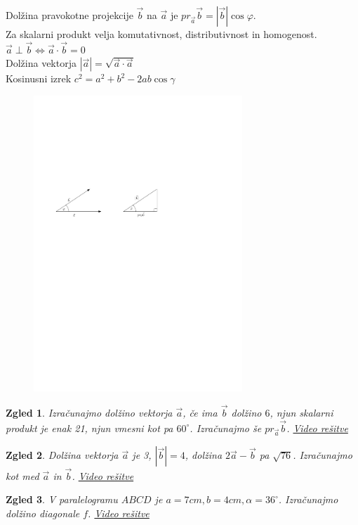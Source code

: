 \documentclass{article}
\newtheorem*{zgled}{Zgled}
\begin{document}
Dolžina pravokotne projekcije $\vec{b}$ na $\vec{a}$ je $pr_{\vec{a}}\vec{b}=|\vec{b}|\cos\varphi$.\\

Za skalarni produkt velja komutativnost, distributivnost in homogenost.\\

$\vec{a} \perp\vec{b} \iff \vec{a}\cdot\vec{b}=0$\\

Dolžina vektorja $|\vec{a}|=\sqrt{\vec{a}\cdot\vec{a}}$\\

Kosinusni izrek $c^2=a^2+b^2-2ab\cos\gamma$

\begin{figure}[H]
\includegraphics[width=0.7\textwidth]{skalarni.produkt.pdf}
\centering
\end{figure}

\begin{zgled}
    Izračunajmo dolžino vektorja $\vec{a}$, če ima $\vec{b}$ dolžino $6$, njun skalarni produkt je enak 21, njun vmesni kot pa $60^\circ$. Izračunajmo še $pr_{\vec{a}}\vec{b}$.
    \href{https://youtu.be/PCUppodHkyY}{Video rešitve}
\end{zgled}
\begin{zgled}
    Dolžina vektorja $\vec{a}$ je 3, $|\vec{b}|=4$, dolžina $2\vec{a}-\vec{b}$ pa $\sqrt{76}$. Izračunajmo kot med $\vec{a}$ in $\vec{b}$.
    \href{https://youtu.be/xMxlB981-ek}{Video rešitve}
\end{zgled}
\begin{zgled}
    V paralelogramu $ABCD$ je $a=7cm, b=4cm, \alpha=36^\circ$. Izračunajmo dolžino diagonale $f$.
    \href{https://youtu.be/cA2GKU8gsrw}{Video rešitve}
\end{zgled}
\end{document}
